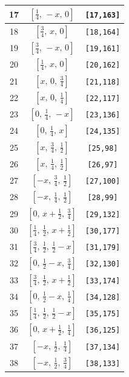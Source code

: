\documentclass[fleqn,8pt]{jsarticle}
\begin{document}
\begin{longtable}{ccc}
17 & $\left[ \frac{1}{4},\, - x,\, 0 \right]$ & {\tt [17,163]} \\ \hline
18 & $\left[ \frac{3}{4},\, x,\, 0 \right]$ & {\tt [18,164]} \\ \hline
19 & $\left[ \frac{3}{4},\, - x,\, 0 \right]$ & {\tt [19,161]} \\ \hline
20 & $\left[ \frac{1}{4},\, x,\, 0 \right]$ & {\tt [20,162]} \\ \hline
21 & $\left[ x,\, 0,\, \frac{3}{4} \right]$ & {\tt [21,118]} \\ \hline
22 & $\left[ x,\, 0,\, \frac{1}{4} \right]$ & {\tt [22,117]} \\ \hline
23 & $\left[ 0,\, \frac{1}{4},\, - x \right]$ & {\tt [23,136]} \\ \hline
24 & $\left[ 0,\, \frac{1}{4},\, x \right]$ & {\tt [24,135]} \\ \hline
25 & $\left[ x,\, \frac{3}{4},\, \frac{1}{2} \right]$ & {\tt [25,98]} \\ \hline
26 & $\left[ x,\, \frac{1}{4},\, \frac{1}{2} \right]$ & {\tt [26,97]} \\ \hline
27 & $\left[ - x,\, \frac{3}{4},\, \frac{1}{2} \right]$ & {\tt [27,100]} \\ \hline
28 & $\left[ - x,\, \frac{1}{4},\, \frac{1}{2} \right]$ & {\tt [28,99]} \\ \hline
29 & $\left[ 0,\, x + \frac{1}{2},\, \frac{3}{4} \right]$ & {\tt [29,132]} \\ \hline
30 & $\left[ \frac{1}{4},\, \frac{1}{2},\, x + \frac{1}{2} \right]$ & {\tt [30,177]} \\ \hline
31 & $\left[ \frac{3}{4},\, \frac{1}{2},\, \frac{1}{2} - x \right]$ & {\tt [31,179]} \\ \hline
32 & $\left[ 0,\, \frac{1}{2} - x,\, \frac{3}{4} \right]$ & {\tt [32,130]} \\ \hline
33 & $\left[ \frac{3}{4},\, \frac{1}{2},\, x + \frac{1}{2} \right]$ & {\tt [33,174]} \\ \hline
34 & $\left[ 0,\, \frac{1}{2} - x,\, \frac{1}{4} \right]$ & {\tt [34,128]} \\ \hline
35 & $\left[ \frac{1}{4},\, \frac{1}{2},\, \frac{1}{2} - x \right]$ & {\tt [35,175]} \\ \hline
36 & $\left[ 0,\, x + \frac{1}{2},\, \frac{1}{4} \right]$ & {\tt [36,125]} \\ \hline
37 & $\left[ - x,\, \frac{1}{2},\, \frac{1}{4} \right]$ & {\tt [37,134]} \\ \hline
38 & $\left[ - x,\, \frac{1}{2},\, \frac{3}{4} \right]$ & {\tt [38,133]} \\ \hline

\end{longtable}
\end{document}
